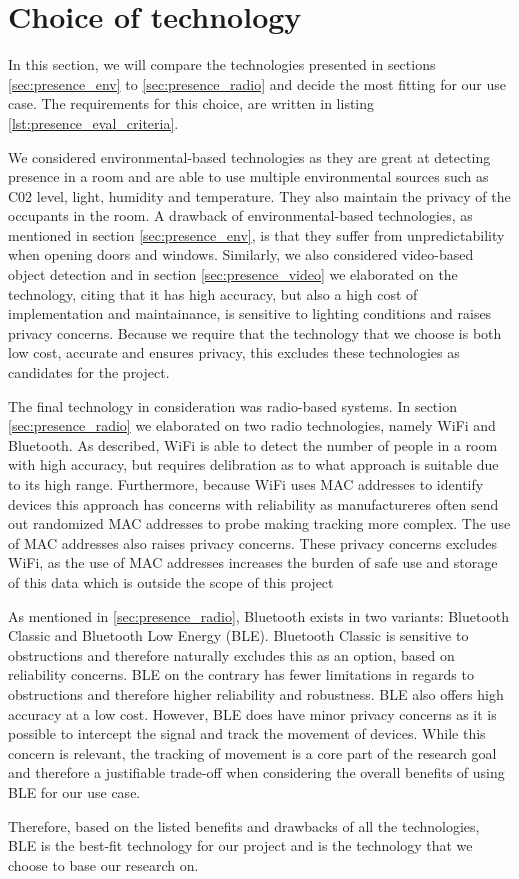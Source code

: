 \section{Choice of technology}
In this section, we will compare the technologies presented in sections \ref{sec:presence_env} to \ref{sec:presence_radio} and decide the most fitting for our use case. 
The requirements for this choice, are written in listing \ref{lst:presence_eval_criteria}.

We considered environmental-based technologies as they are great at detecting presence in a room and are able to use multiple environmental sources such as C02 level, light, humidity and temperature. 
They also maintain the privacy of the occupants in the room. 
A drawback of environmental-based technologies, as mentioned in section \ref{sec:presence_env}, is that they suffer from unpredictability when opening doors and windows. 
Similarly, we also considered video-based object detection and in section \ref{sec:presence_video} we elaborated on the technology, citing that it has high accuracy, but also a high cost of implementation and maintainance, is sensitive to lighting conditions and raises privacy concerns.
Because we require that the technology that we choose is both low cost, accurate and ensures privacy, this excludes these technologies as candidates for the project.

The final technology in consideration was radio-based systems. In section \ref{sec:presence_radio} we elaborated on two radio technologies, namely WiFi and Bluetooth. 
As described, WiFi is able to detect the number of people in a room with high accuracy, but requires delibration as to what approach is suitable due to its high range. 
Furthermore, because WiFi uses MAC addresses to identify devices this approach has concerns with reliability as manufactureres often send out randomized MAC addresses to probe making tracking more complex. 
The use of MAC addresses also raises privacy concerns. 
These privacy concerns excludes WiFi, as the use of MAC addresses increases the burden of safe use and storage of this data which is outside the scope of this project

As mentioned in \ref{sec:presence_radio}, Bluetooth exists in two variants: Bluetooth Classic and Bluetooth Low Energy (BLE). Bluetooth Classic is sensitive to obstructions and therefore naturally excludes this as an option, based on reliability concerns. 
BLE on the contrary has fewer limitations in regards to obstructions and therefore higher reliability and robustness.
BLE also offers high accuracy at a low cost.
However, BLE does have minor privacy concerns as it is possible to intercept the signal and track the movement of devices.
While this concern is relevant, the tracking of movement is a core part of the research goal and therefore a justifiable trade-off when considering the overall benefits of using BLE for our use case.

Therefore, based on the listed benefits and drawbacks of all the technologies, BLE is the best-fit technology for our project and is the technology that we choose to base our research on.